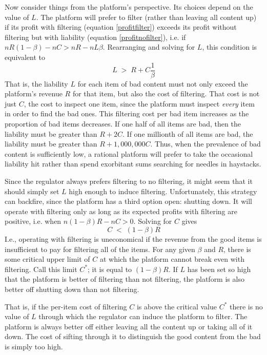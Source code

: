 Now consider things from the platform's perspective.  Its choices depend on the value of $L$. The platform will prefer to filter (rather than leaving all content up) if its profit with filtering (equation \ref{profitfilter}) exceeds its profit without filtering but with liability (equation \ref{profitnofilter}), i.e. if $nR(1 - \beta) - nC >  nR - nL\beta$. Rearranging and solving for $L$,  this condition is equivalent to 
\begin{equation}
\label{dofilter}
L \;>\; R + C\frac{1}{\beta}
\end{equation}
That is, the liability $L$ for each item of bad content must not only exceed the platform's revenue $R$ for that item, but also the cost of filtering. That cost is not just $C$, the cost to inspect one item, since the platform must inspect \emph{every} item in order to find the bad ones. This filtering cost per bad item increases as the proportion of bad items decreases. If one half of all items are bad, then the  liability must be greater than $R + 2C$. If one millionth of all items are bad, the liability must be greater than $R + 1,000,000C$. Thus, when the prevalence of bad content is sufficiently low, a rational platform  will prefer to take the occasional liability hit rather than spend exorbitant sums searching for needles in haystacks.  

Since the regulator always prefers filtering to no filtering, it might seem that it should simply set $L$ high enough to induce filtering. Unfortunately, this strategy can backfire, since the platform has a third option open: shutting down. It will operate with filtering only as long as its expected profits with filtering are positive, i.e. when $n(1 - \beta)R - nC > 0$. Solving for $C$ gives 
\begin{equation}
\label{doshutdown}
C \;<\; (1 - \beta) R
\end{equation}
I.e., operating with filtering is uneconomical if the revenue from the good items is insufficient to pay for filtering all of the items. For any given $\beta$ and $R$, there is some critical upper limit of $C$ at which the platform cannot break even with filtering. Call this limit $C^*$; it is equal to $(1-\beta) R$. If $L$ has been set so high that the platform is better of filtering than not filtering, the platform is also better off shutting down than not filtering.

That is, if the per-item cost of filtering $C$ is above the critical value $C^*$ there is no value of $L$ through which the regulator can induce the platform to filter. The platform is always better off either leaving all the content up or taking all of it down. The cost of sifting through it to distinguish the good content from the bad is simply too high.

